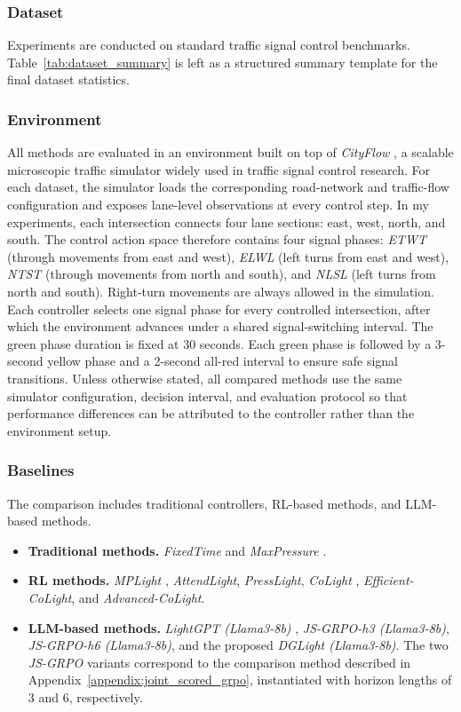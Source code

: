 \subsubsection{Dataset}
Experiments are conducted on standard traffic signal control benchmarks. Table~\ref{tab:dataset_summary} is left as a structured summary template for the final dataset statistics.


\subsubsection{Environment}
All methods are evaluated in an environment built on top of \textit{CityFlow} \cite{tang2019cityflowcityscalebenchmarkmultitarget}, a scalable microscopic traffic simulator widely used in traffic signal control research. For each dataset, the simulator loads the corresponding road-network and traffic-flow configuration and exposes lane-level observations at every control step. In my experiments, each intersection connects four lane sections: east, west, north, and south. The control action space therefore contains four signal phases: \textit{ETWT} (through movements from east and west), \textit{ELWL} (left turns from east and west), \textit{NTST} (through movements from north and south), and \textit{NLSL} (left turns from north and south). Right-turn movements are always allowed in the simulation. Each controller selects one signal phase for every controlled intersection, after which the environment advances under a shared signal-switching interval. The green phase duration is fixed at 30 seconds. Each green phase is followed by a 3-second yellow phase and a 2-second all-red interval to ensure safe signal transitions. Unless otherwise stated, all compared methods use the same simulator configuration, decision interval, and evaluation protocol so that performance differences can be attributed to the controller rather than the environment setup.

\subsubsection{Baselines}
The comparison includes traditional controllers, RL-based methods, and LLM-based methods.
\begin{itemize}
    \item \textbf{Traditional methods.} \textit{FixedTime} \cite{webster} and \textit{MaxPressure} \cite{MERCADER2020275}.
    \item \textbf{RL methods.} \textit{MPLight} \cite{Chen_Wei_Xu_Zheng_Yang_Xiong_Xu_Li_2020}, \textit{AttendLight}, \textit{PressLight}, \textit{CoLight} \cite{10.1145/3357384.3357902}, \textit{Efficient-CoLight}, and \textit{Advanced-CoLight}.
    \item \textbf{LLM-based methods.} \textit{LightGPT (Llama3-8b)} \cite{lai2024llmlightlargelanguagemodels}, \textit{JS-GRPO-h3 (Llama3-8b)}, \textit{JS-GRPO-h6 (Llama3-8b)}, and the proposed \textit{DGLight (Llama3-8b)}. The two \textit{JS-GRPO} variants correspond to the comparison method described in Appendix~\ref{appendix:joint_scored_grpo}, instantiated with horizon lengths of 3 and 6, respectively.
\end{itemize}

